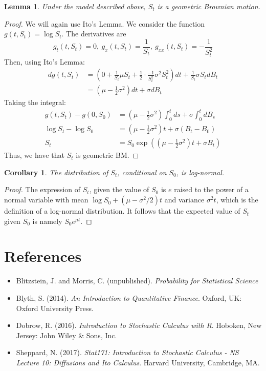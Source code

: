 \documentclass{article}
\newtheorem{corollary}{Corollary}[theorem]
\newtheorem{lemma}[theorem]{Lemma}
\begin{document}
\begin{lemma}
Under the model described above, $S_t$ is a geometric Brownian motion. 
\end{lemma}
\begin{proof}
We will again use Ito's Lemma.  We consider the function $g(t,S_t) = \log S_t$.  The derivatives are
$$g_t(t,S_t) = 0,\ g_x(t,S_t) = \frac{1}{S_t},\ g_{xx}(t,S_t) = -\frac{1}{S_t^2}$$
Then, using Ito's Lemma: 
\begin{align*}
dg(t,S_t) &= \left( 0 + \frac{1}{S_t} \mu S_t + \frac12 \cdot \frac{-1}{S_t^2} \sigma^2 S_t^2\right) dt + \frac{1}{S_t}\sigma S_t dB_t \\
&= \left( \mu - \frac12 \sigma^2\right)dt + \sigma dB_t
\end{align*}
Taking the integral: 
\begin{align*}
g(t,S_t) - g(0,S_0) &= \left( \mu - \frac12 \sigma^2\right) \int_0^t ds + 
\sigma \int_0^t dB_s \\
\log S_t - \log S_0 &= \left( \mu - \frac12 \sigma^2\right)t + \sigma (B_t - B_0) \\
S_t &= S_0 \exp\left( \left( \mu - \frac12 \sigma^2\right)t + \sigma B_t\right)
\end{align*}
Thus, we have that $S_t$ is geometric BM.  

\end{proof}

\begin{corollary}
The distribution of $S_t$, conditional on $S_0$, is log-normal.
\end{corollary}
\begin{proof}
The expression of $S_t$, given the value of $S_0$ is $e$ raised to the power of a normal variable with mean $\log S_0 + (\mu - \sigma^2/2)t$ and variance $\sigma^2t$, which is the definition of a log-normal distribution. It follows that the expected value of $S_t$ given $S_0$ is namely $S_0e^{\mu t}$.

\end{proof}




\section*{References}
\begin{itemize}
\item Blitzstein, J. and Morris, C. (unpublished). \emph{Probability for Statistical Science}
\item Blyth, S. (2014). \emph{An Introduction to Quantitative Finance}. Oxford, UK: Oxford University Press.
\item Dobrow, R. (2016). \emph{Introduction to Stochastic Calculus with R}. Hoboken, New Jersey: John Wiley \& Sons, Inc.
\item Sheppard, N. (2017). \emph{Stat171: Introduction to Stochastic Calculus - NS Lecture 10: Diffusions and Ito Calculus}.  Harvard University, Cambridge, MA.
\end{itemize}
\end{document}

